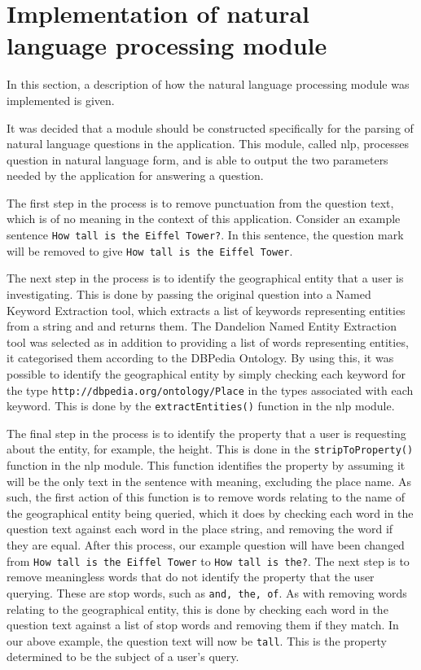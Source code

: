 \documentclass[authoryearcitations]{UoYCSproject}
\begin{document}
\section{Implementation of natural language processing module}
In this section, a description of how the natural language processing module was implemented is given.

It was decided that a module should be constructed specifically for the parsing of natural language questions in the application.  This module, called nlp, processes question in natural language form, and is able to output the two parameters needed by the application for answering a question.

The first step in the process is to remove punctuation from the question text, which is of no meaning in the context of this application. Consider an example sentence \texttt{How tall is the Eiffel Tower?}. In this sentence, the question mark will be removed to give \texttt{How tall is the Eiffel Tower}.

\begin{sloppypar} %
The next step in the process is to identify the geographical entity that a user is investigating. This is done by passing the original question into a Named Keyword Extraction tool, which extracts a list of keywords representing entities from a string and and returns them. The Dandelion Named Entity Extraction tool was selected as in addition to providing a list of words representing entities, it categorised them according to the DBPedia Ontology. By using this, it was possible to identify the geographical entity by simply checking each keyword for the type \texttt{http://dbpedia.org/ontology/Place} in the types associated with each keyword.  This is done by the \texttt{extractEntities()} function in the nlp module.
\end{sloppypar}

The final step in the process is to identify the property that a user is requesting about the entity, for example, the height. This is done in the \texttt{stripToProperty()} function in the nlp module. This function identifies the property by assuming it will be the only text in the sentence with meaning, excluding the place name. As such, the first action of this function is to remove words relating to the name of the geographical entity being queried, which it does by checking each word in the question text against each word in the place string, and removing the word if they are equal. After this process, our example question will have been changed from \texttt{How tall is the Eiffel Tower} to \texttt{How tall is the?}. The next step is to remove meaningless words that do not identify the property that the user querying. These are stop words, such as \texttt{and, the, of}. As with removing words relating to the geographical entity, this is done by checking each word in the question text against a list of stop words and removing them if they match. In our above example, the question text will now be \texttt{tall}. This is the property determined to be the subject of a user's query.
\end{document}
